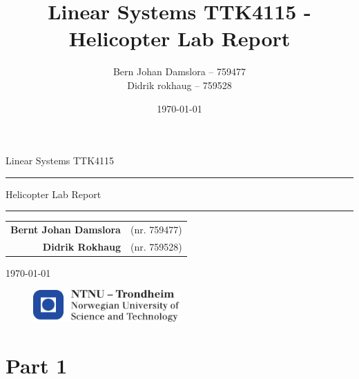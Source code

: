 \documentclass{article}
\title{Linear Systems TTK4115 - Helicopter Lab Report}
\author{Bern Johan Damslora -- 759477 \\ Didrik rokhaug -- 759528}
\date{\today}
\begin{document}
\begin{titlepage}
    \begin{center}
    	\large
    	Linear Systems TTK4115
    \end{center}
    \vspace{\fill}
    \rule{\linewidth}{0.5mm}
    \begin{center}
    	\huge
    	Helicopter Lab Report
    \end{center}
	\rule{\linewidth}{0.5mm}
	\vspace{\fill}

    \begin{table}[H]
    	\centering
    	\large
    	\begin{tabular}{rl}
    		\textbf{Bernt Johan Damslora} & (nr. 759477) \\
    		\textbf{Didrik Rokhaug} &  (nr. 759528)
    	
    	\end{tabular}
    \end{table}
    \vspace{\fill}
    \begin{center}
    	\large
    	\today
    \end{center}
	\vspace{\fill}
    \begin{figure}[H]
    \centering
    \includegraphics[width=0.5\textwidth]{images/logontnu_eng}
    \end{figure}
    \thispagestyle{empty}
\end{titlepage}

\tableofcontents
\thispagestyle{empty} %
\newpage    

\setcounter{page}{1}
\section{Part 1}




\newpage

\end{document}
